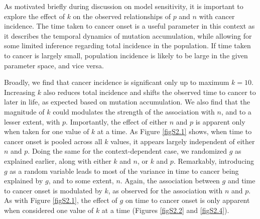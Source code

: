 \documentclass[9pt,onecolumn,twoside]{pnas-new}
\begin{document}
		As motivated briefly during discussion on model sensitivity, it is important to explore the effect of $k$ on the observed relationships of $p$ and $n$ with cancer incidence. The time taken to cancer onset is a useful parameter in this context as it describes the temporal dynamics of mutation accumulation, while allowing for some limited inference regarding total incidence in the population. If time taken to cancer is largely small, population incidence is likely to be large in the given parameter space, and vice versa.

		Broadly, we find that cancer incidence is significant only up to maximum $k=10$. Increasing $k$ also reduces total incidence and shifts the observed time to cancer to later in life, as expected based on mutation accumulation. We also find that the magnitude of $k$ could modulates the strength of the association with $n$, and to a lesser extent, with $p$. Importantly, the effect of either $n$ and $p$ is apparent only when taken for one value of $k$ at a time. As Figure \ref{figS2.1} shows, when time to cancer onset is pooled across all $k$ values, it appears largely independent of either $n$ and $p$.
		Doing the same for the context-dependent case, we randomized $g$ as explained earlier, along with either $k$ and $n$, or $k$ and $p$. Remarkably, introducing $g$ as a random variable leads to most of the variance in time to cancer being explained by $g$, and to some extent, $n$. Again, the association between $g$ and time to cancer onset is modulated by $k$, as observed for the association with $n$ and $p$. As with Figure \ref{figS2.1}, the effect of $g$ on time to cancer onset is only apparent when considered one value of $k$ at a time (Figures \ref{figS2.2} and \ref{figS2.4}).
\end{document}
